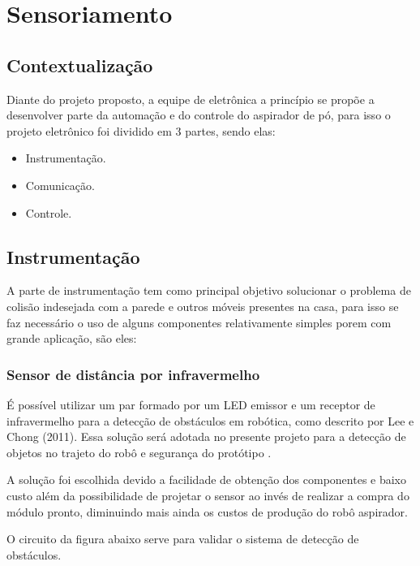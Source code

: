 \section{Sensoriamento} %
\subsection{Contextualização}
\label{sub:contextualização}
Diante do projeto proposto, a equipe de eletrônica a princípio se propõe a desenvolver parte da automação e do controle do aspirador de pó, para isso o projeto eletrônico foi dividido em 3 partes, sendo elas:
  \begin{itemize}
    \item Instrumentação.
    \item Comunicação.
    \item Controle.
  \end{itemize}

\subsection{Instrumentação} %
\label{sub:instrumentação}


A parte de instrumentação tem como principal objetivo solucionar o problema de colisão indesejada com a parede e outros móveis presentes na casa, para isso se faz necessário o uso de alguns componentes relativamente simples porem com grande aplicação, são eles:
 
  \subsubsection{Sensor de distância por infravermelho} 
  \label{sub:Sensor_de_distância_por_infravermelho}
    É possível utilizar um par formado por um LED emissor e um receptor de infravermelho para a detecção de obstáculos em robótica, como descrito por Lee e Chong (2011).  Essa solução será adotada no presente projeto para a detecção de objetos no trajeto do robô e segurança do protótipo \cite{detectar_objeto}.

    A solução foi escolhida devido a facilidade de obtenção dos componentes e baixo custo além da possibilidade de projetar o sensor ao invés de realizar a compra do módulo pronto, diminuindo mais ainda os custos de produção do robô aspirador.

    O circuito da figura abaixo serve para validar o sistema de detecção de obstáculos.

